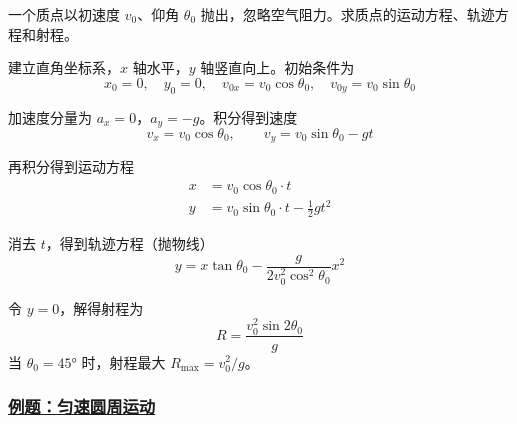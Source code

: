 \begin{example}[抛体运动]
    一个质点以初速度 $v_0$、仰角 $\theta_0$ 抛出，忽略空气阻力。求质点的运动方程、轨迹方程和射程。
    \begin{solution}
        建立直角坐标系，$x$ 轴水平，$y$ 轴竖直向上。初始条件为
        \begin{equation}
            x_0 = 0, \quad y_0 = 0, \quad v_{0x} = v_0\cos\theta_0, \quad v_{0y} = v_0\sin\theta_0
        \end{equation}
        
        加速度分量为 $a_x = 0$，$a_y = -g$。积分得到速度
        \begin{equation}
            v_x = v_0\cos\theta_0, \qquad v_y = v_0\sin\theta_0 - gt
        \end{equation}
        
        再积分得到运动方程
        \begin{align}
            x &= v_0\cos\theta_0 \cdot t \\
            y &= v_0\sin\theta_0 \cdot t - \frac{1}{2}gt^2
        \end{align}
        
        消去 $t$，得到轨迹方程（抛物线）
        \begin{equation}
            y = x\tan\theta_0 - \frac{g}{2v_0^2\cos^2\theta_0}x^2
        \end{equation}
        
        令 $y = 0$，解得射程为
        \begin{equation}
            R = \frac{v_0^2\sin 2\theta_0}{g}
        \end{equation}
        当 $\theta_0 = 45°$ 时，射程最大 $R_{\max} = v_0^2/g$。
    \end{solution}
\end{example}

\subsubsection{\protect\hyperlink{:}{例题：匀速圆周运动}}


